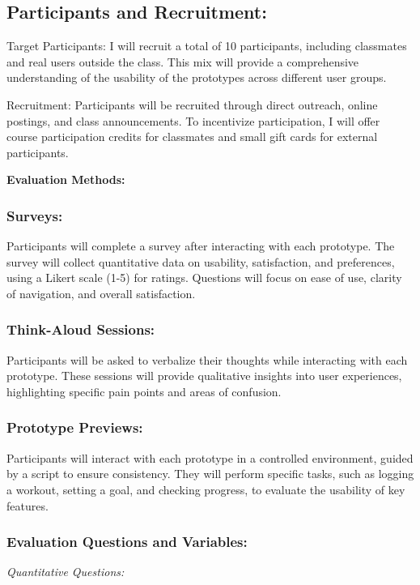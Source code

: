 \documentclass[
	letterpaper, %
]{jdf}
\begin{document}
\subsection{Participants and Recruitment:}
Target Participants: I will recruit a total of 10 participants, including classmates and real users outside the class. This mix will provide a comprehensive understanding of the usability of the prototypes across different user groups.

Recruitment: Participants will be recruited through direct outreach, online postings, and class announcements. To incentivize participation, I will offer course participation credits for classmates and small gift cards for external participants.

\textbf{Evaluation Methods:}
\subsubsection{Surveys:} 

Participants will complete a survey after interacting with each prototype. The survey will collect quantitative data on usability, satisfaction, and preferences, using a Likert scale (1-5) for ratings. Questions will focus on ease of use, clarity of navigation, and overall satisfaction.

\subsubsection{Think-Aloud Sessions:}

Participants will be asked to verbalize their thoughts while interacting with each prototype. These sessions will provide qualitative insights into user experiences, highlighting specific pain points and areas of confusion.

\subsubsection{Prototype Previews:}

Participants will interact with each prototype in a controlled environment, guided by a script to ensure consistency. They will perform specific tasks, such as logging a workout, setting a goal, and checking progress, to evaluate the usability of key features.

\subsubsection{Evaluation Questions and Variables:}
\textit{Quantitative Questions:}
\end{document}
